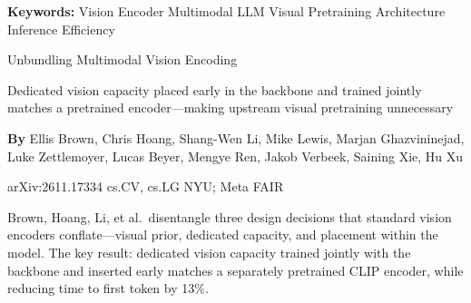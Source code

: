 \documentclass[10pt,twocolumn]{article}
\begin{document}
\setlength{\parindent}{0pt}
\setlength{\parskip}{4pt}

{\small\color{keywordgray}\textbf{Keywords:}
  Vision Encoder \textbullet{} Multimodal LLM \textbullet{} Visual Pretraining \textbullet{} Architecture \textbullet{} Inference Efficiency}\par\vspace{4pt}

{\LARGE\bfseries\raggedright Unbundling Multimodal Vision Encoding}\par\vspace{4pt}
{\large\itshape\raggedright Dedicated vision capacity placed early in the backbone and trained jointly matches a pretrained encoder---making upstream visual pretraining unnecessary}\par\vspace{6pt}
{\small\textbf{By} Ellis Brown, Chris Hoang, Shang-Wen Li, Mike Lewis, Marjan Ghazvininejad, Luke Zettlemoyer, Lucas Beyer, Mengye Ren, Jakob Verbeek, Saining Xie, Hu Xu}\par\vspace{2pt}
{\small\color{keywordgray}arXiv:2611.17334 \textbullet{} cs.CV, cs.LG \textbullet{} NYU; Meta FAIR}
\par\vspace{2pt}\noindent{\color{rulered}\rule{\columnwidth}{0.6pt}}\vspace{6pt}

Brown, Hoang, Li, et al.\ disentangle three design decisions that standard vision encoders conflate---visual prior, dedicated capacity, and placement within the model.
The key result: dedicated vision capacity trained jointly with the backbone and inserted early matches a separately pretrained CLIP encoder, while reducing time to first token by 13\%.
\end{document}
